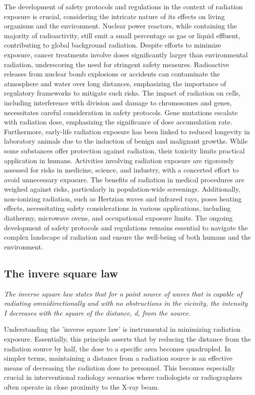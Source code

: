 \documentclass[a4paper,12pt]{report}
\begin{document}
The development of safety protocols and regulations in the context of radiation exposure is
crucial, considering the intricate nature of its effects on living organisms and the environment.
Nuclear power reactors, while containing the majority of radioactivity, still emit a small
percentage as gas or liquid effluent, contributing to global background radiation. Despite efforts
to minimize exposure, cancer treatments involve doses significantly larger than environmental
radiation, underscoring the need for stringent safety measures. Radioactive releases from nuclear
bomb explosions or accidents can contaminate the atmosphere and water over long distances,
emphasizing the importance of regulatory frameworks to mitigate such risks. The impact of
radiation on cells, including interference with division and damage to chromosomes and genes,
necessitates careful consideration in safety protocols. Gene mutations escalate with radiation
dose, emphasizing the significance of dose accumulation rate. Furthermore, early-life radiation
exposure has been linked to reduced longevity in laboratory animals due to the induction of
benign and malignant growths. While some substances offer protection against radiation, their
toxicity limits practical application in humans. Activities involving radiation exposure are
rigorously assessed for risks in medicine, science, and industry, with a concerted effort to avoid
unnecessary exposure. The benefits of radiation in medical procedures are weighed against risks,
particularly in population-wide screenings. Additionally, non-ionizing radiation, such as Hertzian
waves and infrared rays, poses heating effects, necessitating safety considerations in various
applications, including diathermy, microwave ovens, and occupational exposure limits. The
ongoing development of safety protocols and regulations remains essential to navigate the
complex landscape of radiation and ensure the well-being of both humans and the environment.

\subsection{The invere square law}

\textit{The inverse square law states that for a point source of waves that is capable of radiating omnidirectionally and with no obstructions in the vicinity, the intensity I decreases with the square of the distance, d, from the source. }

Understanding the 'inverse square law' is instrumental in minimizing radiation exposure.
Essentially, this principle asserts that by reducing the distance from the radiation source by half,
the dose to a specific area becomes quadrupled. In simpler terms, maintaining a distance from a
radiation source is an effective means of decreasing the radiation dose to personnel. This
becomes especially crucial in interventional radiology scenarios where radiologists or
radiographers often operate in close proximity to the X-ray beam.
\end{document}
